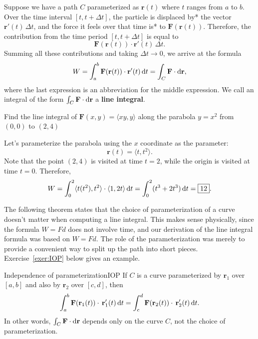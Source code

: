 \documentclass{watsonbook}
\begin{document}
Suppose we have a path $C$ parameterized as $\mathbf{r}(t)$ where $t$
ranges from $a$ to $b$. Over the time interval $[t,t+\Delta t]$, the
particle is displaced by* the vector $\mathbf{r}'(t) \, \Delta t$, and
the force it feels over that time is* to $\mathbf{F}(\mathbf{r}(t))$.
Therefore, the contribution from the time period $[t, t+\Delta t]$ is
equal to 
\[
  \mathbf{F}(\mathbf{r}(t)) \cdot \mathbf{r}'(t) \, \Delta t. 
\]
Summing all these contributions and taking $\Delta t \to 0$, we arrive
at the formula
\[
  W = \int_a^b \mathbf{F}(\mathbf{r}(t)) \cdot \mathbf{r}'(t) \, {\mathrm{d}}t =
  \int_C \mathbf{F} \cdot \mathrm{d}\mathbf{r}, 
\]
where the last expression is an abbreviation for the middle
expression. We call an integral of the form $\int_C \mathbf{F} \cdot
\mathrm{d}\mathbf{r}$ a \textbf{line integral}. 

\begin{example}{}{}
  Find the line integral of $\mathbf{F}(x,y) = \langle xy, y \rangle$
  along the parabola $y = x^2$ from 
  $(0,0)$ to $(2,4)$
\end{example}

\begin{solution}
  Let's parameterize the parabola using the $x$ coordinate as the
  parameter:
  \[
    \mathbf{r}(t) = \langle t, t^2 \rangle. 
  \]
  Note that the point $(2,4)$ is visited at time $t=2$, while the
  origin is visited at time $t=0$. Therefore, 
  \[
    W = \int_0^2 \langle t(t^2), t^2 \rangle \cdot \langle 1, 2t \rangle
    \, {\mathrm{d}}t = \int_0^2 (t^3 + 2t^3) \, {\mathrm{d}}t = \boxed{12}. 
  \]
\end{solution}

The following theorem states that the choice of parameterization of a
curve doesn't matter when computing a line integral. This makes sense
physically, since the formula $W = Fd$ does not involve time, and our
derivation of the line integral formula was based on $W=Fd$. The role
of the parameterization was merely to provide a convenient way to split
up the path into short pieces. Exercise~\ref{exer:IOP} below gives an
example.

\begin{theo}{Independence of parameterization}{IOP}
  If $C$ is a curve parameterized by $\mathbf{r}_1$ over $[a,b]$ and
  also by $\mathbf{r}_2$ over $[c,d]$, then
  \[
    \int_a^b\mathbf{F}(\mathbf{r}_1(t))  \cdot \,
    \mathbf{r}'_1(t) \, {\mathrm{d}}t =
    \int_c^d \mathbf{F}(\mathbf{r}_2(t))  \cdot \,
    \mathbf{r}'_2(t) \, {\mathrm{d}}t. 
  \]
  In other words, $\int_C \mathbf{F} \cdot \mathrm{d}\mathbf{r}$ depends only
  on the curve $C$, not the choice of parameterization. 
\end{theo}
\end{document}
